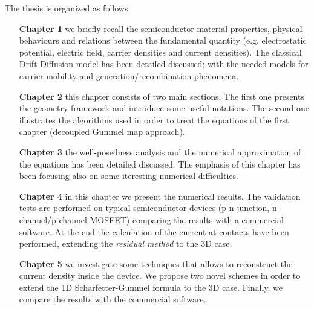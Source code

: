The thesis is organized as follows:
\begin{itemize}[leftmargin=2.4cm]
\item[\bf Chapter 1] we briefly recall the semiconductor material properties, physical behaviours and relations between the fundamental quantity (e.g. electrostatic potential, electric field, carrier densities and current densities). The classical Drift-Diffusion model has been detailed discussed; with the needed models for carrier mobility and generation/recombination phenomena.

\item[\bf Chapter 2] this chapter consists of two main sections. The first one presents the geometry framework and introduce some useful notations. The second one illustrates the algorithms used in order to treat the equations of the first chapter (decoupled Gummel map approach).

\item[\bf Chapter 3] the well-posedness analysis and the numerical approximation of the equations has been detailed discussed. The emphasis of this chapter has been focusing also on some iteresting numerical difficulties. 

\item[\bf Chapter 4] in this chapter we present the numerical results. The validation tests are performed on typical semiconductor devices (p-n junction, n-channel/p-channel MOSFET) comparing the results with a commercial software. At the end the calculation of the current at contacts have been performed, extending the \textit{residual method} \cite{ContactCurrentRM} to the 3D case.

\item[\bf Chapter 5] we investigate some techniques that allows to reconstruct the current density inside the device. We propose two novel schemes in order to extend the 1D Scharfetter-Gummel formula \cite{Gummel:SignAnalys} to the 3D case. Finally, we compare the results with the commercial software.

\end{itemize}

